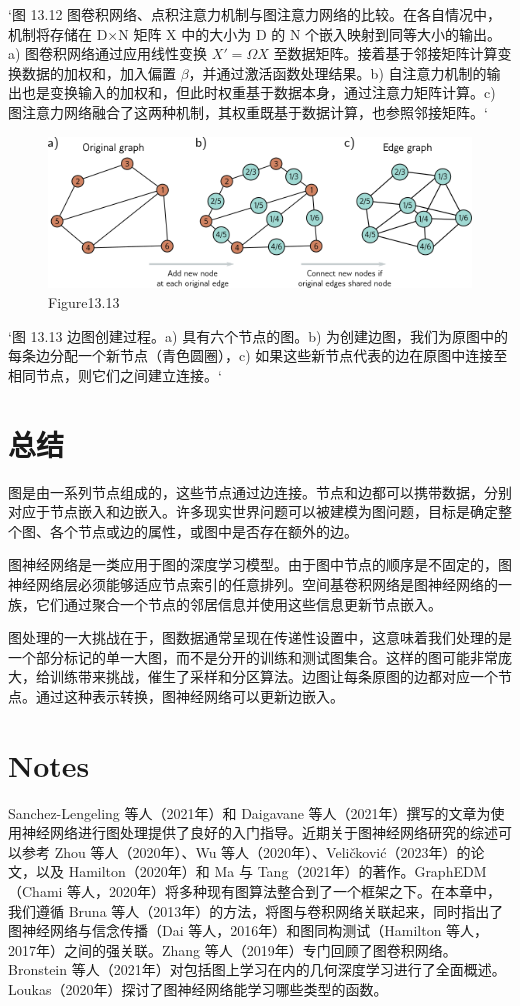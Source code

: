 `图 13.12 图卷积网络、点积注意力机制与图注意力网络的比较。在各自情况中，机制将存储在 D×N 矩阵 X 中的大小为 D 的 N 个嵌入映射到同等大小的输出。a) 图卷积网络通过应用线性变换 \(X \prime = \Omega X\) 至数据矩阵。接着基于邻接矩阵计算变换数据的加权和，加入偏置 \(\beta\)，并通过激活函数处理结果。b) 自注意力机制的输出也是变换输入的加权和，但此时权重基于数据本身，通过注意力矩阵计算。c) 图注意力网络融合了这两种机制，其权重既基于数据计算，也参照邻接矩阵。`


\begin{figure}[ht!]
\centering
\includegraphics[width=0.7\linewidth]{png/chapter13/GraphAdjoint.png}
\caption{Figure13.13}
\end{figure}

`图 13.13 边图创建过程。a) 具有六个节点的图。b) 为创建边图，我们为原图中的每条边分配一个新节点（青色圆圈），c) 如果这些新节点代表的边在原图中连接至相同节点，则它们之间建立连接。`
\section{总结}

图是由一系列节点组成的，这些节点通过边连接。节点和边都可以携带数据，分别对应于节点嵌入和边嵌入。许多现实世界问题可以被建模为图问题，目标是确定整个图、各个节点或边的属性，或图中是否存在额外的边。

图神经网络是一类应用于图的深度学习模型。由于图中节点的顺序是不固定的，图神经网络层必须能够适应节点索引的任意排列。空间基卷积网络是图神经网络的一族，它们通过聚合一个节点的邻居信息并使用这些信息更新节点嵌入。

图处理的一大挑战在于，图数据通常呈现在传递性设置中，这意味着我们处理的是一个部分标记的单一大图，而不是分开的训练和测试图集合。这样的图可能非常庞大，给训练带来挑战，催生了采样和分区算法。边图让每条原图的边都对应一个节点。通过这种表示转换，图神经网络可以更新边嵌入。

\section{Notes}
Sanchez-Lengeling 等人（2021年）和 Daigavane 等人（2021年）撰写的文章为使用神经网络进行图处理提供了良好的入门指导。近期关于图神经网络研究的综述可以参考 Zhou 等人（2020年）、Wu 等人（2020年）、Veličković（2023年）的论文，以及 Hamilton（2020年）和 Ma 与 Tang（2021年）的著作。GraphEDM（Chami 等人，2020年）将多种现有图算法整合到了一个框架之下。在本章中，我们遵循 Bruna 等人（2013年）的方法，将图与卷积网络关联起来，同时指出了图神经网络与信念传播（Dai 等人，2016年）和图同构测试（Hamilton 等人，2017年）之间的强关联。Zhang 等人（2019年）专门回顾了图卷积网络。Bronstein 等人（2021年）对包括图上学习在内的几何深度学习进行了全面概述。Loukas（2020年）探讨了图神经网络能学习哪些类型的函数。

